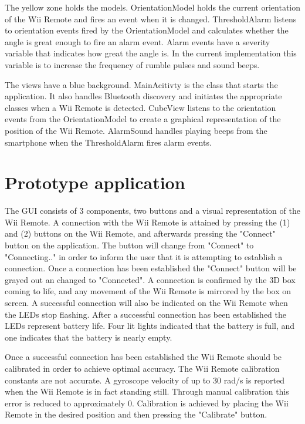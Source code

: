 The yellow zone holds the models. OrientationModel holds the current orientation of the Wii Remote and fires an event when it is changed. ThresholdAlarm listens to orientation events fired by the OrientationModel and calculates whether the angle is great enough to fire an alarm event. Alarm events have a severity variable that indicates how great the angle is. In the current implementation this variable is to increase the frequency of rumble pulses and sound beeps.

The views have a blue background. MainAcitivty is the class that starts the application. It also handles Bluetooth discovery and initiates the appropriate classes when a Wii Remote is detected. CubeView listens to the orientation events from the OrientationModel to create a graphical representation of the position of the Wii Remote. AlarmSound handles playing beeps from the smartphone when the ThresholdAlarm fires alarm events. 

\section{Prototype application}
The GUI consists of 3 components, two buttons and a visual representation of the Wii Remote. A connection with the Wii Remote is attained by pressing the (1) and (2) buttons on the Wii Remote, and afterwards pressing the "Connect" button on the application. The button will change from "Connect" to "Connecting.." in order to inform the user that it is attempting to establish a connection. Once a connection has been established the "Connect" button will be grayed out an changed to "Connected". A connection is confirmed by the 3D box coming to life, and any movement of the Wii Remote is mirrored by the box on screen. A successful connection will also be indicated on the Wii Remote when the LEDs stop flashing. After a successful connection has been established the LEDs represent battery life. Four lit lights indicated that the battery is full, and one indicates that the battery is nearly empty.

Once a successful connection has been established the Wii Remote should be calibrated in order to achieve optimal accuracy. The Wii Remote calibration constants are not accurate. A gyroscope velocity of up to 30 rad/s is reported when the Wii Remote is in fact standing still. Through manual calibration this error is reduced to approximately 0. Calibration is achieved by placing the Wii Remote in the desired position and then pressing the "Calibrate" button.

